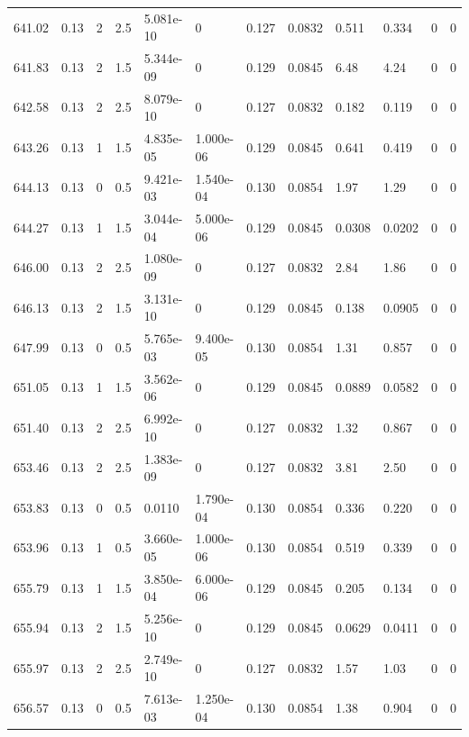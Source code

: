 \documentclass[preview]{standalone}
\begin{document}
{{{{{{{{{{{\begin{tabular}{L{1.2cm}C{1.2cm} C{0.3cm}C{0.5cm} C{1.4cm}C{1.4cm} C{1.4cm}C{1.4cm} C{1.6cm}C{1.6cm} C{1.6cm}C{1.6cm}}
  641.02  &  0.13  & 2     & 2.5 &  5.081e-10  & 0  &  0.127&   0.0832& 0.511 & 0.334   &  0 & 0  \\ 
  641.83  &  0.13  & 2     & 1.5 &  5.344e-09  & 0  &  0.129&   0.0845& 6.48 & 4.24   &  0 & 0  \\ 
  642.58  &  0.13  & 2     & 2.5 &  8.079e-10  & 0  &  0.127&   0.0832& 0.182 & 0.119   &  0 & 0  \\ 
  643.26  &  0.13  & 1     & 1.5 &  4.835e-05  & 1.000e-06  &  0.129&   0.0845& 0.641 & 0.419   &  0 & 0  \\ 
  644.13  &  0.13  & 0     & 0.5 &  9.421e-03  & 1.540e-04  &  0.130&   0.0854& 1.97 & 1.29   &  0 & 0  \\ 
  644.27  &  0.13  & 1     & 1.5 &  3.044e-04  & 5.000e-06  &  0.129&   0.0845& 0.0308 & 0.0202   &  0 & 0  \\ 
  646.00  &  0.13  & 2     & 2.5 &  1.080e-09  & 0  &  0.127&   0.0832& 2.84 & 1.86   &  0 & 0  \\ 
  646.13  &  0.13  & 2     & 1.5 &  3.131e-10  & 0  &  0.129&   0.0845& 0.138 & 0.0905   &  0 & 0  \\ 
  647.99  &  0.13  & 0     & 0.5 &  5.765e-03  & 9.400e-05  &  0.130&   0.0854& 1.31 & 0.857   &  0 & 0  \\ 
  651.05  &  0.13  & 1     & 1.5 &  3.562e-06  & 0  &  0.129&   0.0845& 0.0889 & 0.0582   &  0 & 0  \\ 
  651.40  &  0.13  & 2     & 2.5 &  6.992e-10  & 0  &  0.127&   0.0832& 1.32 & 0.867   &  0 & 0  \\ 
  653.46  &  0.13  & 2     & 2.5 &  1.383e-09  & 0  &  0.127&   0.0832& 3.81 & 2.50   &  0 & 0  \\ 
  653.83  &  0.13  & 0     & 0.5 &  0.0110  & 1.790e-04  &  0.130&   0.0854& 0.336 & 0.220   &  0 & 0  \\ 
  653.96  &  0.13  & 1     & 0.5 &  3.660e-05  & 1.000e-06  &  0.130&   0.0854& 0.519 & 0.339   &  0 & 0  \\ 
  655.79  &  0.13  & 1     & 1.5 &  3.850e-04  & 6.000e-06  &  0.129&   0.0845& 0.205 & 0.134   &  0 & 0  \\ 
  655.94  &  0.13  & 2     & 1.5 &  5.256e-10  & 0  &  0.129&   0.0845& 0.0629 & 0.0411   &  0 & 0  \\ 
  655.97  &  0.13  & 2     & 2.5 &  2.749e-10  & 0  &  0.127&   0.0832& 1.57 & 1.03   &  0 & 0  \\ 
  656.57  &  0.13  & 0     & 0.5 &  7.613e-03  & 1.250e-04  &  0.130&   0.0854& 1.38 & 0.904   &  0 & 0  \\ 

\end{tabular}}}}}}}}}}}}
\end{document}
